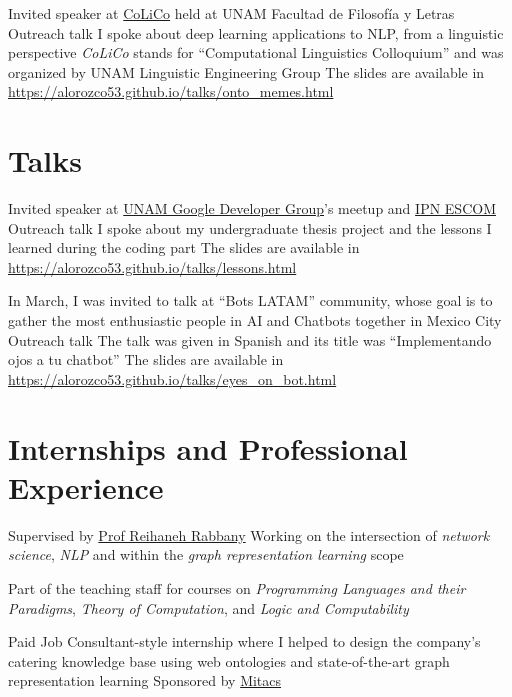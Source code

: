 \documentclass[11pt,a4paper,sans]{moderncv} %
\begin{document}
        {Invited speaker at \href{http://www.corpus.unam.mx/colico/VIIICoLiCo.html}{CoLiCo} held at UNAM Facultad de Filosofía y Letras}
        {Outreach talk}
        {I spoke about deep learning applications to NLP, from a linguistic perspective}
        {\emph{CoLiCo} stands for ``Computational Linguistics Colloquium'' and was organized by UNAM Linguistic Engineering Group}
        {The slides are available in \url{https://alorozco53.github.io/talks/onto_memes.html}}


\section{Talks}

        {Invited speaker at \href{https://www.meetup.com/GDG-UNAM/}{UNAM Google Developer Group}'s meetup and \href{http://www.escom.ipn.mx}{IPN ESCOM}}
        {Outreach talk}
        {I spoke about my undergraduate thesis project and the lessons I learned during the coding part}{}
        {The slides are available in \url{https://alorozco53.github.io/talks/lessons.html}}

        {In March, I was invited to talk at ``Bots LATAM'' community, whose goal is to gather the most enthusiastic people in AI and Chatbots together in Mexico City}
        {Outreach talk}
        {The talk was given in Spanish and its title was ``Implementando ojos a tu chatbot''}{}
        {The slides are available in \url{https://alorozco53.github.io/talks/eyes_on_bot.html}}


\section{Internships and Professional Experience}


        {Supervised by \href{https;//wwww.reirab.com}{Prof Reihaneh Rabbany}}
        {Working on the intersection of \emph{network science}, \emph{NLP} and within the \emph{graph representation learning} scope}
        {}
        {}

        {Part of the teaching staff for courses on \emph{Programming Languages and their Paradigms},
         \emph{Theory of Computation}, and \emph{Logic and Computability}}
        {}
        {}
        {}

        {Paid Job}
        {Consultant-style internship where I helped to design the company's catering knowledge base using
         web ontologies and state-of-the-art graph representation learning}
        {Sponsored by \href{https://www.mitacs.ca/en}{Mitacs}}
        {}
        
\end{document}
